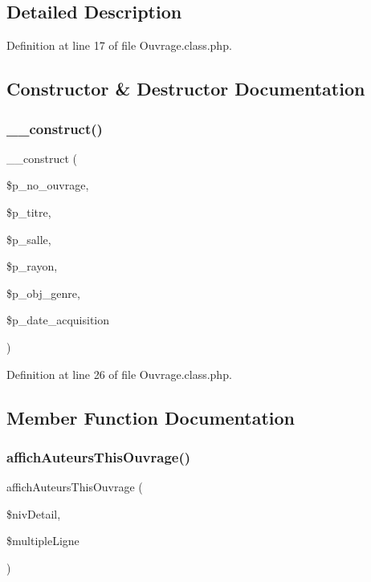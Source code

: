 \subsection{Detailed Description}


Definition at line 17 of file Ouvrage.\+class.\+php.



\subsection{Constructor \& Destructor Documentation}
\mbox{\label{class_ouvrage_a0d6d9b0a6a5b7f4990369a9214ffd303}} 
\subsubsection{\texorpdfstring{\+\_\+\+\_\+construct()}{\_\_construct()}}
{\footnotesize\ttfamily \+\_\+\+\_\+construct (\begin{DoxyParamCaption}\item[{}]{\$p\+\_\+no\+\_\+ouvrage,  }\item[{}]{\$p\+\_\+titre,  }\item[{}]{\$p\+\_\+salle,  }\item[{}]{\$p\+\_\+rayon,  }\item[{}]{\$p\+\_\+obj\+\_\+genre,  }\item[{}]{\$p\+\_\+date\+\_\+acquisition }\end{DoxyParamCaption})}



Definition at line 26 of file Ouvrage.\+class.\+php.



\subsection{Member Function Documentation}
\mbox{\label{class_ouvrage_a12a78e11bb74dd0a93ea3e5857650e4a}} 
\subsubsection{\texorpdfstring{affich\+Auteurs\+This\+Ouvrage()}{affichAuteursThisOuvrage()}}
{\footnotesize\ttfamily affich\+Auteurs\+This\+Ouvrage (\begin{DoxyParamCaption}\item[{}]{\$niv\+Detail,  }\item[{}]{\$multiple\+Ligne }\end{DoxyParamCaption})}

